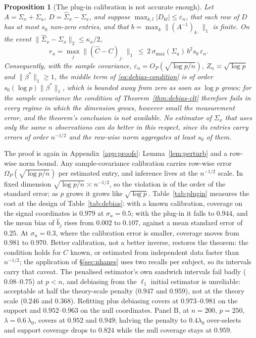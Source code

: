 \documentclass[12pt,a4paper]{article}
\newtheorem{proposition}[theorem]{Proposition}
\theoremstyle{definition}
\theoremstyle{remark}
\newcommand{\betas}{\beta^*}
\newcommand{\Ccal}{C}
\begin{document}
\begin{proposition}[The plug-in calibration is not accurate enough]
\label{prop:plugin}
Let $A=\Sigma_x+\Sigma_u$, $D=\hat\Sigma_x-\Sigma_x$, and suppose
$\max_{k,l}|D_{kl}|\le\varepsilon_n$, that each row of $D$ has at most $s_0$ non-zero
entries, and that $b=\max_k\|(A^{-1})_{k\cdot}\|_1$ is finite. On the event
$\|\hat\Sigma_x-\Sigma_x\|_2\le\kappa_x/2$,
\begin{equation}
r_n=\max_j\big\|(\hat\Ccal-\Ccal)_{j\cdot}\big\|_1
\ \le\ 2\,\sigma_{\max}(\Sigma_u)\,b^{2}s_0\,\varepsilon_n .
\label{eq:plugin}
\end{equation}
Consequently, with the sample covariance, $\varepsilon_n=O_P(\sqrt{\log p/n})$, $Z_n\asymp
\sqrt{\log p}$ and $\|\betas\|_1\ge1$, the middle term of \eqref{eq:debias-condition} is of
order $s_0(\log p)\|\betas\|_1$, which is bounded away from zero as soon as $\log p$ grows;
for the sample covariance the condition of Theorem~\ref{thm:debias-clt} therefore fails in
every regime in which the dimension grows, however small the measurement error, and the
theorem's conclusion is not available. No estimator of $\Sigma_x$ that uses only the same
$n$ observations can do better in this respect, since its entries carry errors of order
$n^{-1/2}$ and the row-wise norm aggregates at least $s_0$ of them.
\end{proposition}

The proof is again in Appendix~\ref{app:proofs}: Lemma~\ref{lem:perturb} and a row-wise norm
bound. Any sample-covariance calibration carries row-wise error
$\Omega_P(\sqrt{\log p/n})$ per estimated entry, and inference lives at the $n^{-1/2}$ scale.
In fixed dimension $\sqrt{\log p/n}\asymp n^{-1/2}$, so the violation is of the order of the
standard error; as $p$ grows it grows like $\sqrt{\log p}$.
Table~\ref{tab:plugin} measures the cost at the design of Table~\ref{tab:debias}: with a
known calibration, coverage on the signal coordinates is $0.979$ at $\sigma_u=0.5$; with the
plug-in it falls to $0.944$, and the mean bias of $\hat b_j$ rises from $0.002$ to $0.107$,
against a mean standard error of $0.25$. At $\sigma_u=0.3$, where the calibration error is
smaller, coverage moves from $0.981$ to $0.970$. Better calibration, not a better inverse,
restores the theorem: the condition holds for $\Ccal$ known, or estimated from independent
data faster than $n^{-1/2}$; the application of \S\ref{sec:nhanes} uses two recalls per
subject, so its intervals carry that caveat. The penalised estimator's own sandwich intervals
fail badly ($0.08$--$0.75$) at $p<n$, and debiasing from the $\ell_1$ initial estimator is
unreliable: acceptable at half the theory-scale penalty ($0.947$ and $0.959$), not at the
theory scale ($0.246$ and $0.368$). Refitting plus debiasing covers at $0.973$--$0.981$ on the
support and $0.952$--$0.963$ on the null coordinates. Panel B, at $n=200$, $p=250$,
$\lambda=0.6\,\lambda_0$, covers at $0.952$ and $0.949$; halving the penalty to $0.4\lambda_0$
over-selects and support coverage drops to $0.824$ while the null coverage stays at $0.959$.
\end{document}
